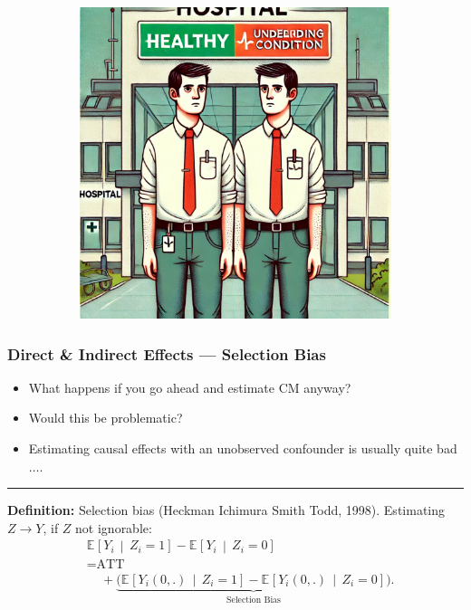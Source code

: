 \documentclass[dvipsnames,handout]{beamer} %
\newcommand{\Egiven}[3][]{\mathbb{E}_{#1} \left[ #2 \, \middle\vert \, #3 \right]} %
\begin{document}
\begin{frame}[noframenumbering]
\begin{figure}[h!]
\begin{subfigure}[c]{0.475\textwidth}
            \includegraphics[width=\textwidth]{
                presentation-files/headlines/health-differences.jpg}
        \end{subfigure}
    \end{figure}
\end{frame}
\begin{frame}
    \frametitle{Direct \& Indirect Effects --- Selection Bias}
    \begin{itemize}
        \item What happens if you go ahead and estimate CM anyway?
        \item Would this be problematic?
        \item Estimating causal effects with an unobserved confounder is usually quite bad$\hdots$.
    \end{itemize}
    \par\noindent\rule{\textwidth}{0.4pt}
    \vskip0.25cm
    \textbf{Definition:} Selection bias (Heckman Ichimura Smith Todd, 1998).
    \vskip0.25cm
    Estimating $Z \to Y$, if $Z$ not ignorable:
    \begin{align*}
        &\Egiven{ Y_i}{Z_i =1} - \Egiven{ Y_i}{Z_i =0} \\
        &= \text{ATT} \\
        &\;\;\;\; + \underbrace{\Big(
            \Egiven{ Y_i(0,.)}{Z_i =1} - \Egiven{ Y_i(0,.)}{Z_i =0} \Big)}_{
                \text{Selection Bias}}.
    \end{align*}
    \vskip1.125cm
\end{frame}
\end{document}
